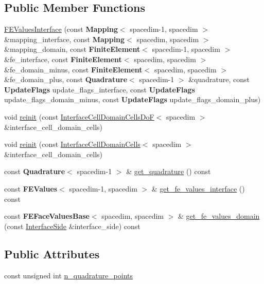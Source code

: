 \subsection*{Public Member Functions}
\begin{DoxyCompactItemize}
\item 
\hyperlink{class_f_e_values_interface_ae48863eabc0754e1cc033143fcd2d443}{F\+E\+Values\+Interface} (const {\bf Mapping}$<$ spacedim-\/1, spacedim $>$ \&mapping\+\_\+interface, const {\bf Mapping}$<$ spacedim, spacedim $>$ \&mapping\+\_\+domain, const {\bf Finite\+Element}$<$ spacedim-\/1, spacedim $>$ \&fe\+\_\+interface, const {\bf Finite\+Element}$<$ spacedim, spacedim $>$ \&fe\+\_\+domain\+\_\+minus, const {\bf Finite\+Element}$<$ spacedim, spacedim $>$ \&fe\+\_\+domain\+\_\+plus, const {\bf Quadrature}$<$ spacedim-\/1 $>$ \&quadrature, const {\bf Update\+Flags} update\+\_\+flags\+\_\+interface, const {\bf Update\+Flags} update\+\_\+flags\+\_\+domain\+\_\+minus, const {\bf Update\+Flags} update\+\_\+flags\+\_\+domain\+\_\+plus)
\item 
void \hyperlink{class_f_e_values_interface_a334ed0ef179516854690e7e3fa273aa0}{reinit} (const \hyperlink{class_interface_cell_domain_cells_do_f}{Interface\+Cell\+Domain\+Cells\+DoF}$<$ spacedim $>$ \&interface\+\_\+cell\+\_\+domain\+\_\+cells)
\item 
void \hyperlink{class_f_e_values_interface_a875a17d471069ddb97cbd8e6f7aba2b8}{reinit} (const \hyperlink{class_interface_cell_domain_cells}{Interface\+Cell\+Domain\+Cells}$<$ spacedim $>$ \&interface\+\_\+cell\+\_\+domain\+\_\+cells)
\item 
const {\bf Quadrature}$<$ spacedim-\/1 $>$ \& \hyperlink{class_f_e_values_interface_afb7be190894c93ccf7ffdd4ff9bb6447}{get\+\_\+quadrature} () const 
\item 
const {\bf F\+E\+Values}$<$ spacedim-\/1, spacedim $>$ \& \hyperlink{class_f_e_values_interface_a6d70108a06e5604bac341818da2d8223}{get\+\_\+fe\+\_\+values\+\_\+interface} () const 
\item 
const {\bf F\+E\+Face\+Values\+Base}$<$ spacedim, spacedim $>$ \& \hyperlink{class_f_e_values_interface_a8e222051f35763d2aec65d1840d2581a}{get\+\_\+fe\+\_\+values\+\_\+domain} (const \hyperlink{triangulation__system_8h_a44f3c00e36c1d6e3c389ae693c09b435}{Interface\+Side} \&interface\+\_\+side) const 
\end{DoxyCompactItemize}
\subsection*{Public Attributes}
\begin{DoxyCompactItemize}
\item 
const unsigned int \hyperlink{class_f_e_values_interface_a100afc348b15432f9e241ff56ebffa8d}{n\+\_\+quadrature\+\_\+points}
\end{DoxyCompactItemize}

